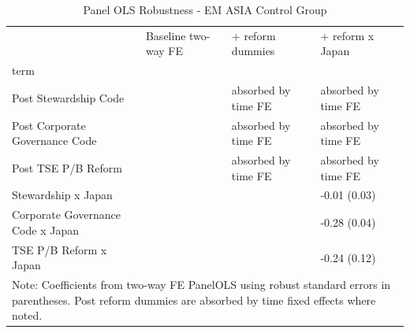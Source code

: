 \begin{table}
\caption{Panel OLS Robustness - EM ASIA Control Group}
\label{tab:robust_alt_em_asia}
\begin{tabular}{llll}
\toprule
 & Baseline two-way FE & + reform dummies & + reform x Japan \\
term &  &  &  \\
\midrule
Post Stewardship Code &  & absorbed by time FE & absorbed by time FE \\
Post Corporate Governance Code &  & absorbed by time FE & absorbed by time FE \\
Post TSE P/B Reform &  & absorbed by time FE & absorbed by time FE \\
Stewardship x Japan &  &  & -0.01 (0.03) \\
Corporate Governance Code x Japan &  &  & -0.28 (0.04) \\
TSE P/B Reform x Japan &  &  & -0.24 (0.12) \\
\multicolumn{4}{l}{\footnotesize Note: Coefficients from two-way FE PanelOLS using robust standard errors in parentheses. Post reform dummies are absorbed by time fixed effects where noted.} \\
\bottomrule
\end{tabular}
\end{table}
